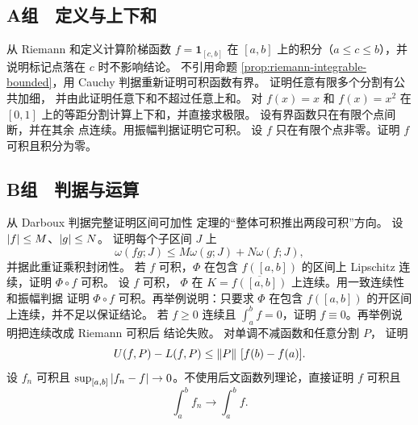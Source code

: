 \subsection*{A组　定义与上下和}
\begin{enumerate}[label=\textbf{\thechapter.\arabic*.}]
  从 Riemann 和定义计算阶梯函数
 \(f=\mathbf 1_{[c,b]}\) 在 \([a,b]\) 上的积分（\(a\le c\le b\)），并说明标记点落在 \(c\)
 时不影响结论。
  不引用命题
 \ref{prop:riemann-integrable-bounded}，用 Cauchy 判据重新证明可积函数有界。
  证明任意有限多个分割有公共加细，
 并由此证明任意下和不超过任意上和。
  对
 \(f(x)=x\) 和 \(f(x)=x^2\) 在 \([0,1]\) 上的等距分割计算上下和，并直接求极限。
  设有界函数只在有限个点间断，并在其余
 点连续。用振幅判据证明它可积。
  设 \(f\) 只在有限个点非零。证明
 \(f\) 可积且积分为零。
\end{enumerate}

\subsection*{B组　判据与运算}
\begin{enumerate}[label=\textbf{\thechapter.\arabic*.},resume]
  从 Darboux 判据完整证明区间可加性
 定理的“整体可积推出两段可积”方向。
  设 \(\left|f\right|\le M\)、\(\left|g\right|\le N\)。
 证明每个子区间 \(J\) 上
 \[
  \omega(fg;J)\le M\omega(g;J)+N\omega(f;J),
 \]
 并据此重证乘积封闭性。
  若 \(f\) 可积，\(\Phi\) 在包含
 \(f([a,b])\) 的区间上 Lipschitz 连续，证明 \(\Phi\circ f\) 可积。
  设 \(f\) 可积，
 \(\Phi\) 在 \(K=\overline{f([a,b])}\) 上连续。用一致连续性和振幅判据
 证明 \(\Phi\circ f\) 可积。再举例说明：只要求 \(\Phi\) 在包含
 \(f([a,b])\) 的开区间上连续，并不足以保证结论。
  若 \(f\ge0\) 连续且
 \(\int_a^b f=0\)，证明 \(f\equiv0\)。再举例说明把连续改成 Riemann 可积后
 结论失败。
  对单调不减函数和任意分割 \(P\)，
 证明
 \[
 U(f,P)-L(f,P)\le\left\lVert P\right\rVert\,[f(b)-f(a)].
 \]
  设 \(f_n\) 可积且
 \(\sup_{[a,b]}\left|f_n-f\right|\to0\)。不使用后文函数列理论，直接证明 \(f\) 可积且
 \[
 \int_a^b f_n\to\int_a^b f.
 \]
\end{enumerate}

